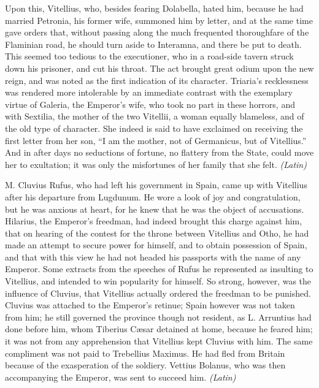
Upon this, Vitellius, who, besides fearing Dolabella, hated him, because he had married Petronia, his former wife, summoned him by letter, and at the same time gave orders that, without passing along the much frequented thoroughfare of the Flaminian road, he should turn aside to Interamna, and there be put to death. This seemed too tedious to the executioner, who in a road-side tavern struck down his prisoner, and cut his throat. The act brought great odium upon the new reign, and was noted as the first indication of its character. Triaria's recklessness was rendered more intolerable by an immediate contrast with the exemplary virtue of Galeria, the Emperor's wife, who took no part in these horrors, and with Sextilia, the mother of the two Vitellii, a woman equally blameless, and of the old type of character. She indeed is said to have exclaimed on receiving the first letter from her son, ``I am the mother, not of Germanicus, but of Vitellius.'' And in after days no seductions of fortune, no flattery from the State, could move her to exultation; it was only the misfortunes of her family that she felt. \emph{(Latin)}


M. Cluvius Rufus, who had left his government in Spain, came up with Vitellius after his departure from Lugdunum. He wore a look of joy and congratulation, but he was anxious at heart, for he knew that he was the object of accusations. Hilarius, the Emperor's freedman, had indeed brought this charge against him, that on hearing of the contest for the throne between Vitellius and Otho, he had made an attempt to secure power for himself, and to obtain possession of Spain, and that with this view he had not headed his passports with the name of any Emperor. Some extracts from the speeches of Rufus he represented as insulting to Vitellius, and intended to win popularity for himself. So strong, however, was the influence of Cluvius, that Vitellius actually ordered the freedman to be punished. Cluvius was attached to the Emperor's retinue; Spain however was not taken from him; he still governed the province though not resident, as L. Arruntius had done before him, whom Tiberius Cæsar detained at home, because he feared him; it was not from any apprehension that Vitellius kept Cluvius with him. The same compliment was not paid to Trebellius Maximus. He had fled from Britain because of the exasperation of the soldiery. Vettius Bolanus, who was then accompanying the Emperor, was sent to succeed him. \emph{(Latin)}

